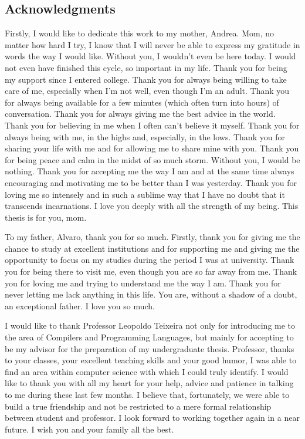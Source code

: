 \thispagestyle{empty}
\begin{spacing}{1.0}
\chapter*{Acknowledgments}

Firstly, I would like to dedicate this work to my mother, Andrea. Mom, no matter how hard I try, I know that I will never be able to express my gratitude in words the way I would like. Without you, I wouldn't even be here today. I would not even have finished this cycle, so important in my life. Thank you for being my support since I entered college. Thank you for always being willing to take care of me, especially when I'm not well, even though I'm an adult. Thank you for always being available for a few minutes (which often turn into hours) of conversation. Thank you for always giving me the best advice in the world. Thank you for believing in me when I often can't believe it myself. Thank you for always being with me, in the highs and, especially, in the lows. Thank you for sharing your life with me and for allowing me to share mine with you. Thank you for being peace and calm in the midst of so much storm. Without you, I would be nothing. Thank you for accepting me the way I am and at the same time always encouraging and motivating me to be better than I was yesterday. Thank you for loving me so intensely and in such a sublime way that I have no doubt that it transcends incarnations. I love you deeply with all the strength of my being. This thesis is for you, mom.

To my father, Alvaro, thank you for so much. Firstly, thank you for giving me the chance to study at excellent institutions and for supporting me and giving me the opportunity to focus on my studies during the period I was at university. Thank you for being there to visit me, even though you are so far away from me. Thank you for loving me and trying to understand me the way I am. Thank you for never letting me lack anything in this life. You are, without a shadow of a doubt, an exceptional father. I love you so much.

I would like to thank Professor Leopoldo Teixeira not only for introducing me to the area of Compilers and Programming Languages, but mainly for accepting to be my advisor for the preparation of my undergraduate thesis. Professor, thanks to your classes, your excellent teaching skills and your good humor, I was able to find an area within computer science with which I could truly identify. I would like to thank you with all my heart for your help, advice and patience in talking to me during these last few months. I believe that, fortunately, we were able to build a true friendship and not be restricted to a mere formal relationship between student and professor. I look forward to working together again in a near future. I wish you and your family all the best.


\end{spacing}

